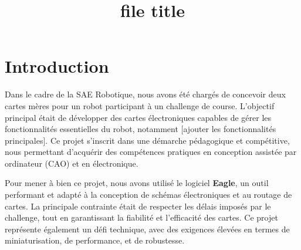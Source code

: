 \documentclass{rapport}
\title{file title} %
\begin{document}
 


 





\subject{SAé Robot} %


 


 


 


       

\buildmargins %

\buildcover %

\toc %

 


 

\section{Introduction}

\label{sec:introduction}

Dans le cadre de la SAE Robotique, nous avons été chargés de concevoir deux cartes mères pour un robot participant à un challenge de course. L'objectif principal était de développer des cartes électroniques capables de gérer les fonctionnalités essentielles du robot, notamment [ajouter les fonctionnalités principales]. Ce projet s'inscrit dans une démarche pédagogique et compétitive, nous permettant d'acquérir des compétences pratiques en conception assistée par ordinateur (CAO) et en électronique.

 

Pour mener à bien ce projet, nous avons utilisé le logiciel \textbf{Eagle}, un outil performant et adapté à la conception de schémas électroniques et au routage de cartes. La principale contrainte était de respecter les délais imposés par le challenge, tout en garantissant la fiabilité et l'efficacité des cartes. Ce projet représente également un défi technique, avec des exigences élevées en termes de miniaturisation, de performance, et de robustesse.
\end{document}
